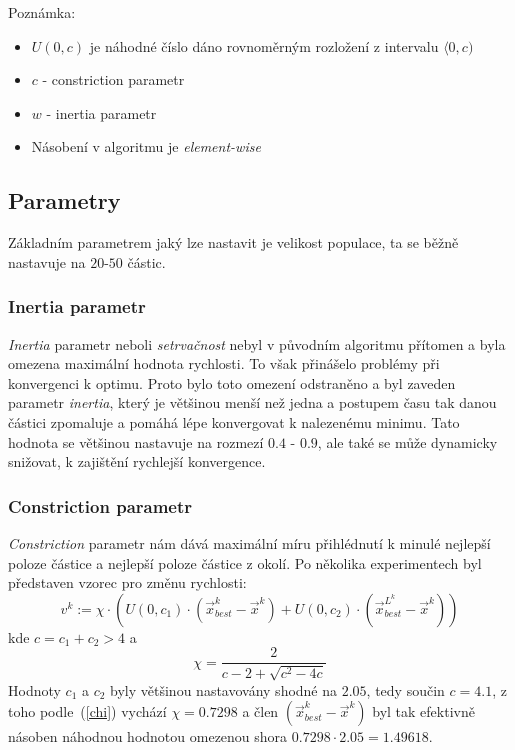 \documentclass[12pt,a4paper,fleqn]{article}
\begin{document}
Poznámka:
\begin{itemize}
\item $U(0,c)$ je náhodné číslo dáno rovnoměrným rozložení z intervalu $\langle 0, c)$
\item $c$ - constriction parametr
\item $w$ - inertia parametr
\item Násobení v algoritmu je \textit{element-wise}
\end{itemize}

\subsection{Parametry}
Základním parametrem jaký lze nastavit je velikost populace, ta se běžně nastavuje na $20$-$50$ částic.

\subsubsection{Inertia parametr}
\textit{Inertia} parametr neboli \textit{setrvačnost} nebyl v původním algoritmu přítomen a byla omezena maximální hodnota rychlosti. To však přinášelo problémy při konvergenci k optimu. Proto bylo toto omezení odstraněno a byl zaveden parametr 
\textit{inertia}, který je většinou menší než jedna a postupem času tak danou částici zpomaluje a pomáhá lépe konvergovat k nalezenému minimu. Tato hodnota se většinou nastavuje na rozmezí $0.4$ - $0.9$, ale také se může dynamicky snižovat, k zajištění rychlejší konvergence.


\subsubsection{Constriction parametr}
\textit{Constriction} parametr nám dává maximální míru přihlédnutí k minulé nejlepší poloze částice a nejlepší poloze částice z okolí. Po několika experimentech byl představen vzorec pro změnu rychlosti:
\begin{equation} \label{v-chi}
v^k :=  \chi \cdot \left( U(0,c_1) \cdot (\vec{x}^k_{best} - \vec{x}^k) + U(0,c_2) \cdot (\vec{x}^{L^k}_{best} -  \vec{x}^k) \right)
\end{equation}
kde $c = c_1 + c_2 > 4$ a
\begin{equation} \label{chi}
\chi = \frac{2}{c - 2 + \sqrt{c^2 - 4 c}}
\end{equation}
Hodnoty $c_1$ a $c_2$ byly většinou nastavovány shodné na $2.05$, tedy součin $c = 4.1$, z toho podle~(\ref{chi}) vychází $\chi = 0.7298$ a člen $(\vec{x}^k_{best} - \vec{x}^k)$ byl tak efektivně násoben náhodnou hodnotou omezenou shora $0.7298 \cdot 2.05 = 1.49618$.
\end{document}
